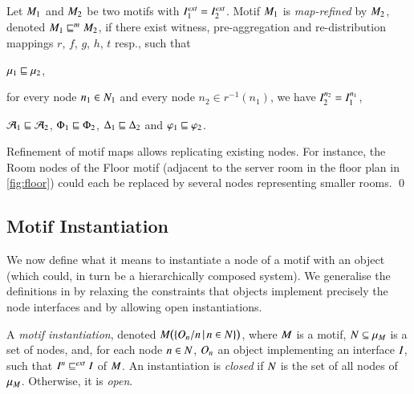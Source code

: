 \documentclass[runningheads]{llncs}
\makeatletter
\newenvironment{textlist}{\begin{enumerate*}[label=(\emph{\roman*})]}{\end{enumerate*}}
\newcommand{\resp}[1][\@ ]{resp.{#1}}
\newcommand{\setdef}[2]{\{#1\,|\,#2\}}
\newcommand{\abstracts}[1][]{\sqsubseteq\ifx#1\relax\else^{#1}\fi}
\newcommand{\isrefinedby}{\abstracts}
\newcommand{\motif}[1][]{M\ifx#1\relax\else^{#1}\fi}
\newcommand{\interface}[1][]{I\ifx#1\relax\else^{#1}\fi}
\newcommand{\map}[1][]{\mu\ifx#1\relax\else^{#1}\fi}
\newcommand{\nodes}[1][]{N\ifx#1\relax\else^{#1}\fi}
\newcommand{\constraint}[1][]{\varphi\ifx#1\relax\else^{#1}\fi}
\newcommand{\profile}[1][]{\Phi\ifx#1\relax\else^{#1}\fi}
\newcommand{\distprofile}[1][]{\Delta\ifx#1\relax\else^{#1}\fi}
\newcommand{\aggregation}[1][]{\mathcal{A}\ifx#1\relax\else^{#1}\fi}
\newcommand{\object}[1][]{O\ifx#1\relax\else^{#1}\fi}
\newcommand{\external}[2][]{\ifx\relax#2\relax#1\mathit{ext}\else#2[#1\mathit{ext}]\fi}
\makeatother
\begin{document}
\begin{definition}
  \label{defn:refine:motif}
  Let $\motif_1$ and $\motif_2$ be two motifs with $\external{\interface}_1 = \external{\interface}_2$.
  Motif $\motif_1$ is \emph{map-refined} by $\motif_2$, denoted $\motif_1 \isrefinedby[m] \motif_2$, if there exist witness, pre-aggregation and re-distribution mappings $r$, $f$, $g$, $h$, $t$ \resp[], such that 
  \begin{textlist}
  \item $\map_1 \isrefinedby \map_2$, 
  \item for every node $n_1 \in \nodes_{1}$ and every node $n_2 \in r^{-1}(n_1)$, we have $\interface[n_2]_{2} = \interface[n_1]_{1}$,
  \item $\aggregation_1 \isrefinedby \aggregation_2$, $\profile_1 \isrefinedby \profile_2$, $\distprofile_1 \isrefinedby \distprofile_2$ and $\constraint_1 \isrefinedby \constraint_2$.
  \end{textlist}
\end{definition}

\begin{example}
  \label{ex:refinement:map}
  Refinement of motif maps allows replicating existing nodes.  For instance, the Room nodes of the Floor motif (adjacent to the server room in the floor plan in \cref{fig:floor}) could each be replaced by several nodes representing smaller rooms.
  \qed
\end{example}

\subsection{Motif Instantiation}
\label{secn:instantiation}

We now define what it means to instantiate a node of a motif with an object (which could, in turn be a hierarchically composed system).  We generalise the definitions in \cite{BCK26-Motifs} by relaxing the constraints that objects implement precisely the node interfaces and by allowing open instantiations.

\begin{definition}[Instantiation]
  \label{defn:instantiation}
  A \emph{motif instantiation}, denoted $\motif\bigl(\setdef{\object_n/n}{n \in N}\bigr)$, where $\motif$ is a motif, $\nodes \subseteq \map_{\motif}$ is a set of nodes, and, for each node $n \in \nodes$, $\object_n$ an object implementing an interface $\interface$, such that $\interface[n] \external{\isrefinedby} \interface$ of $\motif$.  An instantiation is \emph{closed} if $\nodes$ is the set of all nodes of $\map_{\motif}$.  Otherwise, it is \emph{open}.
\end{definition}
\end{document}
